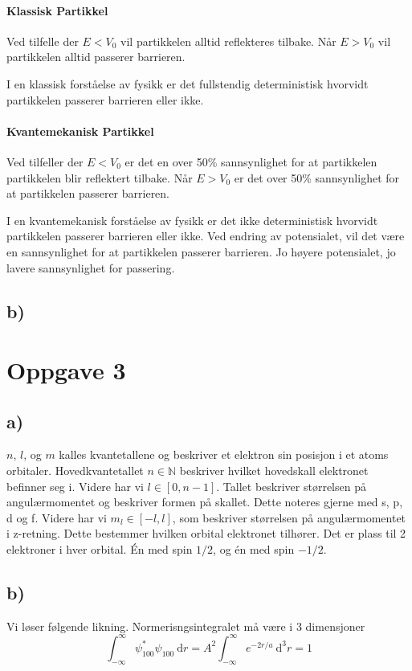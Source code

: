 \documentclass{article}
\begin{document}
\paragraph*{Klassisk Partikkel}

Ved tilfelle der $E < V_0$ vil partikkelen alltid reflekteres tilbake. Når $E > V_0$ vil partikkelen alltid passerer barrieren. 

I en klassisk forståelse av fysikk er det fullstendig deterministisk hvorvidt partikkelen passerer barrieren eller ikke. 

\paragraph*{Kvantemekanisk Partikkel}
Ved tilfeller der $E < V_0$ er det en over 50\% sannsynlighet for at partikkelen partikkelen blir reflektert tilbake. Når $E > V_0$ er det over 50\% sannsynlighet for at partikkelen passerer barrieren. 

I en kvantemekanisk forståelse av fysikk er det ikke deterministisk hvorvidt partikkelen passerer barrieren eller ikke. Ved endring av potensialet, vil det være en sannsynlighet for at partikkelen passerer barrieren. Jo høyere potensialet, jo lavere sannsynlighet for passering. 


\subsection*{b)}


\section*{Oppgave 3}
\subsection*{a)}
$n$, $l$, og $m$ kalles kvantetallene og beskriver et elektron sin posisjon i et atoms orbitaler. Hovedkvantetallet $n ∈ ℕ$ beskriver hvilket hovedskall elektronet befinner seg i. Videre har vi $l ∈ [0, n-1]$. Tallet beskriver størrelsen på angulærmomentet og beskriver formen på skallet. Dette noteres gjerne med  s, p, d og f. Videre har vi $m_l ∈ [-l,l]$, som beskriver størrelsen på angulærmomentet i z-retning. Dette bestemmer hvilken orbital elektronet tilhører. Det er plass til 2 elektroner i hver orbital. Én med spin $1 / 2$, og én med spin $-1 / 2$.

\subsection*{b)}
Vi løser følgende likning. Normerisngsintegralet må være i 3 dimensjoner
\[
∫_{-∞}^{∞} ψ_{100}^{*} ψ_{100} \ \mathrm{d}r = A^2∫_{-∞}^{∞} e^{-2r / a} \ \mathrm{d}^3r = 1
\]
\end{document}
